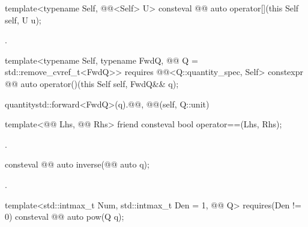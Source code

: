 \begin{itemdecl}
template<typename Self, @@<Self{}> U>
consteval @@ auto operator[](this Self self, U u);
\end{itemdecl}

\begin{itemdescr}
\pnum
\returns
{}.
\end{itemdescr}

\begin{itemdecl}
template<typename Self, typename FwdQ, @@ Q = std::remove_cvref_t<FwdQ>>
  requires @@<Q::quantity_spec, Self{}>
constexpr @@ auto operator()(this Self self, FwdQ&& q);
\end{itemdecl}

\begin{itemdescr}
\pnum
\returns
\begin{codeblock}
quantity{std::forward<FwdQ>(q).@@, @@(self, Q::unit)}
\end{codeblock}
\end{itemdescr}

\begin{itemdecl}
template<@@ Lhs, @@ Rhs>
friend consteval bool operator==(Lhs, Rhs);
\end{itemdecl}

\begin{itemdescr}
\pnum
\returns
{}.
\end{itemdescr}

\begin{itemdecl}
consteval @@ auto inverse(@@ auto q);
\end{itemdecl}

\begin{itemdescr}
\pnum
\returns
{}.
\end{itemdescr}

\begin{itemdecl}
template<std::intmax_t Num, std::intmax_t Den = 1, @@ Q>
  requires(Den != 0)
consteval @@ auto pow(Q q);
\end{itemdecl}

